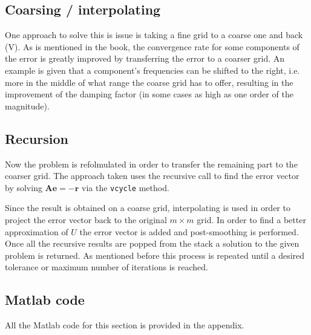 \documentclass[main.tex]{subfiles}
\begin{document}
\subsection*{Coarsing / interpolating}
One approach to solve this is issue is taking a fine grid to a coarse one and back (V). As is mentioned in the book, the convergence rate for some components of the error is greatly improved by transferring the error to a coarser grid. An example is given that a component's frequencies can be shifted to the right, i.e. more in the middle of what range the coarse grid has to offer, resulting in the improvement of the damping factor (in some cases as high as one order of the magnitude).

\subsection*{Recursion}
Now the problem is refolmulated in order to transfer the remaining part to the coarser grid. The approach taken uses the recursive call to find the error vector by solving $\mathbf{A e} = \mathbf{-r}$ via the \texttt{vcycle} method.

Since the result is obtained on a coarse grid, interpolating is used in order to project the error vector back to the original $m \times m$ grid. In order to find a better approximation of $U$ the error vector is added and post-smoothing is performed. Once all the recursive results are popped from the stack a solution to the given problem is returned. As mentioned before this process is repeated until a desired tolerance or maximum number of iterations is reached. 

\subsection*{Matlab code}
All the Matlab code for this section is provided in the appendix. 

    
\end{document}
